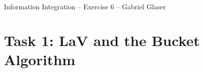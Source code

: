 \documentclass{scrartcl}
\begin{document}
	\begin{center}
		\LARGE
		Information Integration -- Exercise 6 -- Gabriel Glaser
	\end{center}
	
	\section*{Task 1: LaV and the Bucket Algorithm}
	\begin{center}
	\end{center}
\end{document}
